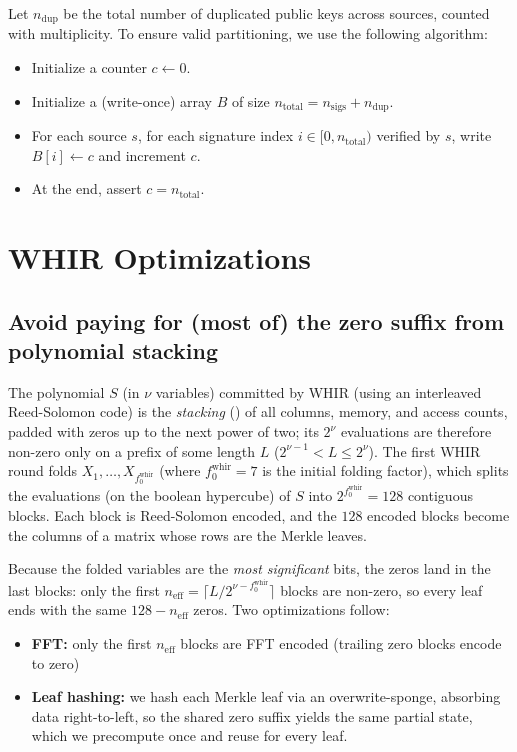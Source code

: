 \documentclass{article}
\theoremstyle{definition}
\begin{document}
Let $n_{\text{dup}}$ be the total number of duplicated public keys across sources, counted with multiplicity. To ensure valid partitioning, we use the following algorithm:

\begin{itemize}
    \item Initialize a counter $c \gets 0$.
    \item Initialize a (write-once) array $B$ of size $n_{\text{total}} = n_{\text{sigs}} + n_{\text{dup}}$.
    \item For each source $s$, for each signature index $i \in [0, n_{\text{total}})$ verified by $s$, write $B[i] \gets c$ and increment $c$.
    \item At the end, assert $c = n_{\text{total}}$.
\end{itemize}


\clearpage
\appendix

\section{WHIR \cite{whir} Optimizations}


\subsection{Avoid paying for (most of) the zero suffix from polynomial stacking}\label{sec:zero-suffix}

The polynomial $S$ (in $\nu$ variables) committed by WHIR (using an interleaved Reed-Solomon code) is the \emph{stacking} () of all columns, memory, and access counts, padded with zeros up to the next power of two; its $2^\nu$ evaluations are therefore non-zero only on a prefix of some length $L$ ($2^{\nu - 1} < L \leq 2^\nu$). The first WHIR round folds $X_1, \ldots, X_{f_0^\text{whir}}$ (where $f_0^\text{whir} = 7$ is the initial folding factor), which splits the evaluations (on the boolean hypercube) of $S$ into $2^{f_0^\text{whir}} = 128$ contiguous blocks. Each block is Reed-Solomon encoded, and the $128$ encoded blocks become the columns of a matrix whose rows are the Merkle leaves.

Because the folded variables are the \emph{most significant} bits, the zeros land in the last blocks: only the first $n_\text{eff} = \lceil L / 2^{\nu - f_0^\text{whir}} \rceil$ blocks are non-zero, so every leaf ends with the same $128 - n_\text{eff}$ zeros. Two optimizations follow:

\begin{itemize}
    \item \textbf{FFT:} only the first $n_\text{eff}$ blocks are FFT encoded (trailing zero blocks encode to zero)
    \item \textbf{Leaf hashing:} we hash each Merkle leaf via an overwrite-sponge, absorbing data right-to-left, so the shared zero suffix yields the same partial state, which we precompute once and reuse for every leaf.
\end{itemize}
\end{document}

